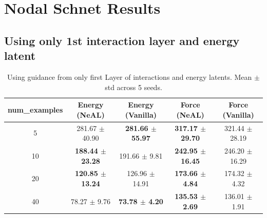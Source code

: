 \documentclass[12pt]{article}
\theoremstyle{definition}
\theoremstyle{remark}
\begin{document}
\section{Nodal Schnet Results}
\subsection{Using only 1st interaction layer and energy latent}
\begin{table}[h!]
\centering
\begin{tabular}{c|cc|cc}
\hline
\textbf{num\_examples} & \textbf{Energy (NeAL)} & \textbf{Energy (Vanilla)} & \textbf{Force (NeAL)} & \textbf{Force (Vanilla)} \\
\hline
5  & 281.67 $\pm$ 40.90 & \textbf{281.66 $\pm$ 55.97} & \textbf{317.17 $\pm$ 29.70} & 321.44 $\pm$ 28.19 \\
10 & \textbf{188.44 $\pm$ 23.28} & 191.66 $\pm$ 9.81 & \textbf{242.95 $\pm$ 16.45} & 246.20 $\pm$ 16.29 \\
20 & \textbf{120.85 $\pm$ 13.24} & 126.96 $\pm$ 14.91 & \textbf{173.66 $\pm$ 4.84} & 174.32 $\pm$ 4.32 \\
40 & 78.27 $\pm$ 9.76 & \textbf{73.78 $\pm$ 4.20} & \textbf{135.53 $\pm$ 2.69} & 136.01 $\pm$ 1.91 \\
\hline
\end{tabular}
\caption{Using guidance from only first Layer of interactions and energy latents. Mean $\pm$ std across 5 seeds.}
\label{tab:neal_vanilla_results}
\end{table}
\newpage
\end{document}

